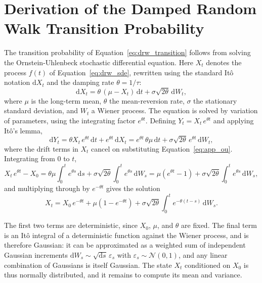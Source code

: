 \chapter{Derivation of the Damped Random Walk Transition Probability}
\label{app:transition}

The transition probability of Equation~\ref{eq:drw_transition} follows from solving the Ornstein-Uhlenbeck stochastic differential equation. Here $X_t$ denotes the process $f(t)$ of Equation~\ref{eq:drw_sde}, rewritten using the standard It\^o notation $\mathrm{d}X_t$ and the damping rate $\theta = 1/\tau$:
\begin{equation}
    \label{eq:app_ou}
    \mathrm{d}X_t = \theta\,(\mu - X_t)\,\mathrm{d}t + \sigma\sqrt{2\theta}\,\mathrm{d}W_t,
\end{equation}
where $\mu$ is the long-term mean, $\theta$ the mean-reversion rate, $\sigma$ the stationary standard deviation, and $W_t$ a Wiener process. The equation is solved by variation of parameters, using the integrating factor $e^{\theta t}$. Defining $Y_t = X_t\,e^{\theta t}$ and applying It\^o's lemma,
\begin{equation}
    \label{eq:app_ito}
    \mathrm{d}Y_t = \theta X_t\, e^{\theta t}\,\mathrm{d}t + e^{\theta t}\,\mathrm{d}X_t
    = e^{\theta t}\,\theta\mu\,\mathrm{d}t + \sigma\sqrt{2\theta}\, e^{\theta t}\,\mathrm{d}W_t,
\end{equation}
where the drift terms in $X_t$ cancel on substituting Equation~\ref{eq:app_ou}. Integrating from $0$ to $t$,
\begin{equation}
    \label{eq:app_integrated}
    X_t\, e^{\theta t} - X_0
    = \theta\mu \int_0^t e^{\theta s}\,\mathrm{d}s
    + \sigma\sqrt{2\theta} \int_0^t e^{\theta s}\,\mathrm{d}W_s
    = \mu\left(e^{\theta t} - 1\right) + \sigma\sqrt{2\theta} \int_0^t e^{\theta s}\,\mathrm{d}W_s,
\end{equation}
and multiplying through by $e^{-\theta t}$ gives the solution
\begin{equation}
    \label{eq:app_solution}
    X_t = X_0\, e^{-\theta t} + \mu\left(1 - e^{-\theta t}\right)
    + \sigma\sqrt{2\theta} \int_0^t e^{-\theta(t-s)}\,\mathrm{d}W_s.
\end{equation}

The first two terms are deterministic, since $X_0$, $\mu$, and $\theta$ are fixed. The final term is an It\^o integral of a deterministic function against the Wiener process, and is therefore Gaussian: it can be approximated as a weighted sum of independent Gaussian increments $\mathrm{d}W_s \sim \sqrt{\mathrm{d}s}\,\varepsilon_s$ with $\varepsilon_s \sim \mathcal{N}(0,1)$, and any linear combination of Gaussians is itself Gaussian. The state $X_t$ conditioned on $X_0$ is thus normally distributed, and it remains to compute its mean and variance.

